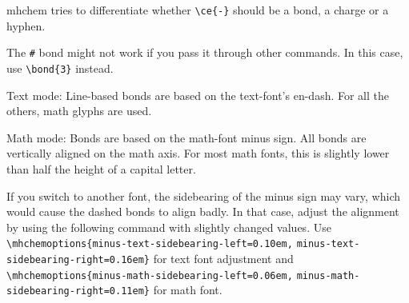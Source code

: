 \documentclass[a4paper,notitlepage,parskip=half]{scrreprt}
\begin{document}
mhchem tries to differentiate whether \verb|\ce{-}| should be a bond, a charge or a hyphen.

The \verb|#| bond might not work if you pass it through other commands. In this case, use \verb|\bond{3}| instead.

\begin{SideBySideExample}[xrightmargin=3cm]
\end{SideBySideExample}

\begin{SideBySideExample}[xrightmargin=3cm]
\end{SideBySideExample}

\begin{SideBySideExample}[xrightmargin=3cm]
\end{SideBySideExample}

\begin{SideBySideExample}[xrightmargin=3cm]
\end{SideBySideExample}

\begin{SideBySideExample}[xrightmargin=3cm]
\end{SideBySideExample}

\begin{SideBySideExample}[xrightmargin=3cm]
\end{SideBySideExample}

Text mode: Line-based bonds are based on the text-font's en-dash. For all the others, math glyphs are used.

Math mode: Bonds are based on the math-font minus sign.  All bonds are vertically aligned on the math axis. For most math fonts, this  is slightly lower than half the height of a capital letter.

If you switch to another font, the sidebearing of the minus sign may vary, which would cause the dashed bonds to align badly. In that  case, adjust the alignment by using the following command with slightly changed values. Use \verb|\mhchemoptions{minus-text-sidebearing-left=0.10em,| \verb|minus-text-sidebearing-right=0.16em}| for text font adjustment and \verb|\mhchemoptions{minus-math-sidebearing-left=0.06em,| \verb|minus-math-sidebearing-right=0.11em}| for math font.
\end{document}
